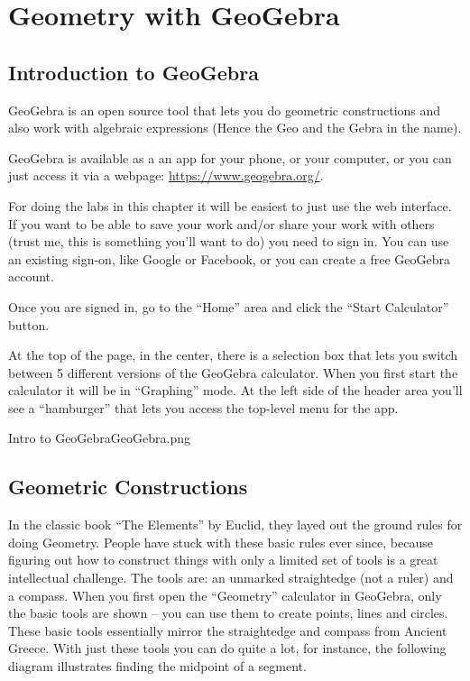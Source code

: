  
\chapter{Geometry with GeoGebra}


\section{Introduction to GeoGebra}
\label{sec:geogebra}

GeoGebra is an open source tool that lets you do geometric constructions and also work with algebraic expressions (Hence the Geo and the Gebra in the name).

GeoGebra is available as a an app for your phone, or your computer, or you can just access it via a webpage: \url{https://www.geogebra.org/}.

For doing the labs in this chapter it will be easiest to just use the web interface.  If you want to be able to save your work and/or share your work with others (trust me, this is something you'll want to do) you need to sign in.  You can use an existing sign-on, like Google or Facebook, or you can create a free GeoGebra account.  

Once you are signed in, go to the ``Home'' area and click the ``Start Calculator'' button.

At the top of the page, in the center, there is a selection box that lets you switch between 5 different versions of the GeoGebra calculator.  When you first start the calculator it will be in ``Graphing'' mode.  At the left side of the header area you'll see a ``hamburger'' that lets you access the top-level menu for the app.

\clearpage
\begin{worksheet}{14}{Intro to GeoGebra}{GeoGebra.png}

\end{worksheet}
\clearpage

\section{Geometric Constructions}

In the classic book ``The Elements'' by Euclid, they layed out the ground rules for doing Geometry.  People have stuck with these basic rules ever since, because figuring out how to construct things with only a limited set of tools is a great intellectual challenge.  The tools are: an unmarked straightedge (not a ruler) and a compass.  When you first open the ``Geometry'' calculator in GeoGebra, only the basic tools are shown -- you can use them to create points, lines and circles.  These basic tools essentially mirror the straightedge and compass from Ancient Greece.  With just these tools you can do quite a lot, for instance, the following diagram illustrates finding the midpoint of a segment.

